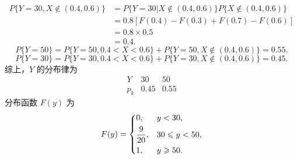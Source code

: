 \begin{solution}
$$\begin{aligned}
        \end{aligned}
    $$
    $$
        \begin{aligned}
            P\{Y=30 , X \notin (0.4,0.6)\}
             & = P\{Y=30 |  X \notin (0.4,0.6)\}P\{X \notin (0.4,0.6)\} \\
             & = 0.8 [F(0.4)-F(0.3) + F(0.7)-F(0.6)]                    \\
             & = 0.8 \times 0.5                                         \\
             & = 0.4.
        \end{aligned}
    $$
    $$
        P\{Y=50\} = P\{Y=50 , 0.4<X<0.6\} + P\{Y=50 , X \notin (0.4,0.6)\} = 0.55.
    $$
    $$
        P\{Y=30\} = P\{Y=30, 0.4<X<0.6\} + P\{Y=30 , X \notin (0.4,0.6)\} = 0.45.
    $$
    综上，$Y$ 的分布律为
    $$
        \begin{array}{c|ccc}
            Y   & 30   & 50   \\
            \hline
            p_k & 0.45 & 0.55
        \end{array}
    $$
    分布函数 $F(y)$ 为
    $$
        F(y) = \begin{dcases}
            0,            & y < 30,              \\
            \frac{9}{20}, & 30 \leqslant y < 50, \\
            1,            & y \geqslant 50.
        \end{dcases}
    $$
\end{solution}

